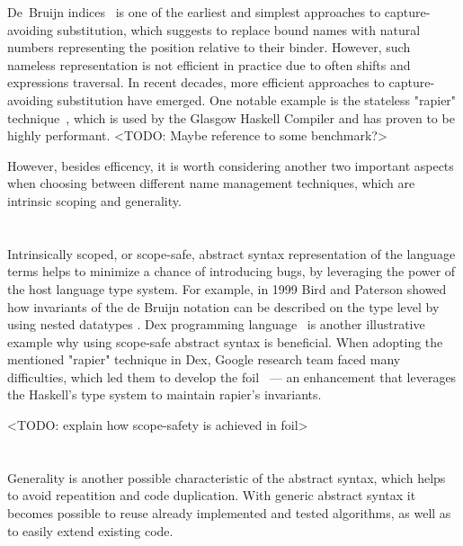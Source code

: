 De~Bruijn indices~\cite{deBruijn1972} is one of the earliest and simplest approaches to capture-avoiding substitution, which suggests to replace bound names with natural numbers representing the position relative to their binder. However, such nameless representation is not efficient in practice due to often shifts and expressions traversal. In recent decades, more efficient approaches to capture-avoiding substitution have emerged. One notable example is the stateless "rapier" technique~\cite{Simon2002_SecretsGHC}, which is used by the Glasgow Haskell Compiler and has proven to be highly performant. <TODO: Maybe reference to some benchmark?>

However, besides efficency, it is worth considering another two important aspects when choosing between different name management techniques, which are intrinsic scoping and generality.

\section{}

Intrinsically scoped, or scope-safe, abstract syntax representation of the language terms helps to minimize a chance of introducing bugs, by leveraging the power of the host language type system. For example, in 1999 Bird and Paterson \cite{BirdPaterson1999_BruijnNested} showed how invariants of the de Bruijn notation can be described on the type level by using nested datatypes \cite{Bird1998_NestedDatatypes}. Dex programming language~\cite{PaszkeDex_2021} is another illustrative example why using scope-safe abstract syntax is beneficial. When adopting the mentioned "rapier" technique in Dex, Google research team faced many difficulties, which led them to develop the foil~\cite{Foil} — an enhancement that leverages the Haskell's type system to maintain rapier's invariants.

<TODO: explain how scope-safety is achieved in foil>

\section{}

Generality is another possible characteristic of the abstract syntax, which helps to avoid repeatition and code duplication. With generic abstract syntax it becomes possible to reuse already implemented and tested algorithms, as well as to easily extend existing code. 

